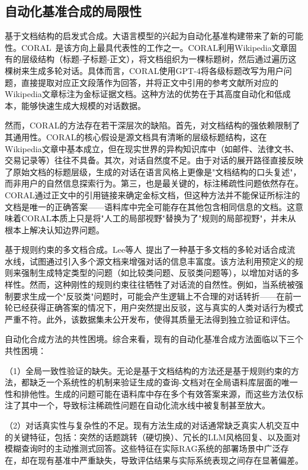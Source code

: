 \subsection{自动化基准合成的局限性}

基于文档结构的启发式合成。大语言模型的兴起为自动化基准构建带来了新的可能性。CORAL~\citep{coral2025}是该方向上最具代表性的工作之一。CORAL利用Wikipedia文章固有的层级结构（标题-子标题-正文），将文档组织为一棵标题树，然后通过遍历这棵树来生成多轮对话。具体而言，CORAL使用GPT-4将各级标题改写为用户问题，直接提取对应正文段落作为回答，并将正文中引用的参考文献所对应的Wikipedia文章标注为金标证据文档。这种方法的优势在于其高度自动化和低成本，能够快速生成大规模的对话数据。

然而，CORAL的方法存在若干深层次的缺陷。首先，对文档结构的强依赖限制了其通用性。CORAL的核心假设是源文档具有清晰的层级标题结构，这在Wikipedia文章中基本成立，但在现实世界的异构知识库中（如邮件、法律文书、交易记录等）往往不具备。其次，对话自然度不足。由于对话的展开路径直接反映了原始文档的标题层级，生成的对话在语言风格上更像是"文档结构的口头复述"，而非用户的自然信息探索行为。第三，也是最关键的，标注稀疏性问题依然存在。CORAL通过正文中的引用链接来确定金标文档，但这种方法并不能保证所标注的文档是唯一的正确答案——语料库中完全可能存在其他包含相同信息的文档。这意味着CORAL本质上只是将"人工的局部视野"替换为了"规则的局部视野"，并未从根本上解决认知边界问题。

基于规则约束的多文档合成。Lee等人~\citep{lee2024multidocumentgroundedmultiturnsynthetic}提出了一种基于多文档的多轮对话合成流水线，试图通过引入多个源文档来增强对话的信息丰富度。该方法利用预定义的规则来强制生成特定类型的问题（如比较类问题、反驳类问题等），以增加对话的多样性。然而，这种刚性的规则约束往往牺牲了对话流的自然性。例如，当系统被强制要求生成一个"反驳类"问题时，可能会产生逻辑上不合理的对话转折——在前一轮已经获得正确答案的情况下，用户突然提出反驳，这与真实的人类对话行为模式严重不符。此外，该数据集未公开发布，使得其质量无法得到独立验证和评估。

自动化合成方法的共性困境。综合来看，现有的自动化基准合成方法面临以下三个共性困境：

（1）全局一致性验证的缺失。无论是基于文档结构的方法还是基于规则约束的方法，都缺乏一个系统性的机制来验证生成的查询-文档对在全局语料库层面的唯一性和排他性。生成的问题可能在语料库中存在多个有效答案来源，而这些方法仅标注了其中一个，导致标注稀疏性问题在自动化流水线中被复制甚至放大。
    
（2）对话真实性与复杂性的不足。现有方法生成的对话通常缺乏真实人机交互中的关键特征，包括：突然的话题跳转（硬切换）、冗长的LLM风格回复、以及面对模糊查询时的主动推测式回答。这些特征在实际RAG系统的部署场景中广泛存在，却在现有基准中严重缺失，导致评估结果与实际系统表现之间存在显著偏差。
    
